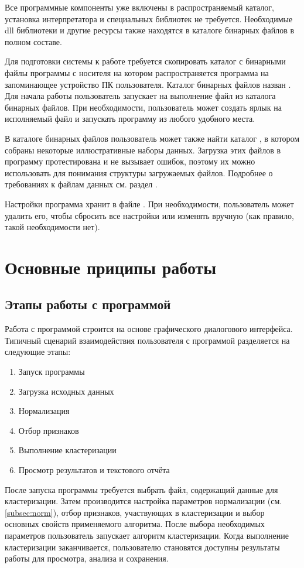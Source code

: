 \documentclass[12pt,tikz]{instruction}
\begin{document}
Все программные компоненты уже включены в распространяемый каталог, установка интерпретатора \Python и специальных библиотек не требуется. Необходимые dll библиотеки и другие ресурсы также  находятся в каталоге бинарных файлов в полном составе.
	
Для подготовки системы к работе требуется скопировать каталог с бинарными файлы программы с носителя на котором распространяется программа на запоминающее устройство ПК пользователя.  Каталог бинарных файлов назван \BinCatalog. Для начала работы пользователь запускает на выполнение файл \ExeFile из каталога бинарных файлов. При необходимости, пользователь может создать ярлык на исполняемый файл и запускать программу из любого удобного места. 

В каталоге бинарных файлов пользователь может также найти каталог \DataCatalog, в котором собраны некоторые иллюстративные наборы данных. Загрузка этих файлов в программу протестирована и не вызывает ошибок, поэтому их можно использовать для понимания структуры загружаемых файлов. Подробнее о требованиях к файлам данных см. раздел .

Настройки программа хранит в файле \SettingsFile. При необходимости, пользователь может удалить его, чтобы сбросить все настройки или изменять вручную (как правило, такой необходимости нет). 
 

\section{Основные приципы работы}

\subsection{Этапы работы с программой}
Работа с программой \SysName строится на основе графического диалогового интерфейса. Типичный сценарий взаимодействия пользователя с программой разделяется на следующие этапы:
\begin{enumerate}
	\item Запуск программы
	\item Загрузка исходных данных
	\item Нормализация
	\item Отбор признаков
	\item Выполнение кластеризации
	\item Просмотр результатов и текстового отчёта
\end{enumerate}

После запуска программы требуется выбрать файл, содержащий данные для кластеризации. Затем производится настройка параметров нормализации (см. \ref{subsec:norm}), отбор признаков, участвующих в кластеризации и выбор основных свойств применяемого алгоритма. После выбора необходимых параметров пользователь запускает алгоритм кластеризации. Когда выполнение кластеризации заканчивается, пользователю становятся доступны результаты работы для просмотра, анализа и сохранения. 
\end{document}

